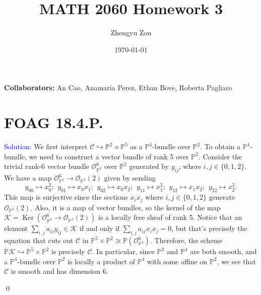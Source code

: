 \documentclass[11pt]{article}
\title{MATH 2060 Homework 3}
\author{Zhengyu Zou}
\date{\today}
\newcommand{\PP}{\mathbb{P}}
\newcommand{\cC}{\mathcal{C}}
\newcommand{\cK}{\mathcal{K}}
\newcommand{\cO}{\mathcal{O}}
\newcommand{\Ker}{\operatorname{Ker}}
\newenvironment{solution}{\begin{trivlist}\item[]{\textcolor{blue}{Solution:}}}{\qed \end{trivlist}}
\begin{document}
\maketitle

\textbf{Collaborators:} An Cao, Anamaria Perez, Ethan Bove, Roberta Pagliaro

\section*{FOAG 18.4.P.}

\begin{solution}
    We first interpret $\cC \hookrightarrow \PP^2 \times \PP^5$ as a $\PP^4$-bundle over $\PP^2$. To obtain a $\PP^4$-bundle, we need to construct a vector bundle of rank 5 over $\PP^2$. Consider the trivial rank-6 vector bundle $\cO_{\PP^2}^6$ over $\PP^2$ generated by $y_{ij}$, where $i,j \in \{0, 1, 2\}$. We have a map $\cO_{\PP^2}^6 \rightarrow \cO_{\PP^2}(2)$ given by sending 
    \[
        y_{00} \mapsto x_0^2; \hspace{5pt}
        y_{01} \mapsto x_0x_1; \hspace{5pt}
        y_{02} \mapsto x_0x_2; \hspace{5pt}
        y_{11} \mapsto x_1^2; \hspace{5pt}
        y_{12} \mapsto x_1x_2; \hspace{5pt}
        y_{22} \mapsto x_2^2.
    \]
    This map is surjective since the sections $x_ix_j$ where $i,j \in \{0, 1, 2\}$ generate $\cO_{\PP^2}(2)$. Also, it is a map of vector bundles, so the kernel of the map $\cK = \Ker(\cO_{\PP^2}^6 \rightarrow \cO_{\PP^2}(2))$ is a locally free sheaf of rank 5. Notice that an element $\sum_{i,j} a_{ij} y_{ij} \in \cK$ if and only if $\sum_{i,j} a_{ij} x_i x_j = 0$, but that's precisely the equation that cuts out $\cC$ in $\PP^5 \times \PP^2 \cong \PP ( \cO_{\PP^2}^6)$. Therefore, the scheme $\PP \cK \hookrightarrow \PP^5 \times \PP^2$ is precisely $\cC$. 
    In particular, since $\PP^2$ and $\PP^4$ are both smooth, and a $\PP^4$-bundle over $\PP^2$ is locally a product of $\PP^4$ with some affine on $\PP^2$, we see that $\cC$ is smooth and has dimension 6. 


\end{solution}
\end{document}

